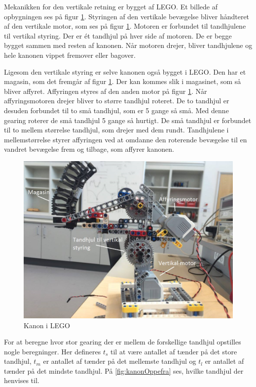 Mekanikken for den vertikale retning er bygget af LEGO. Et billede af opbygningen ses på figur \ref{fig:kanon}. Styringen af den vertikale bevægelse bliver håndteret af den vertikale motor, som ses på figur \ref{fig:kanon}. Motoren er forbundet til tandhjulene til vertikal styring. Der er ét tandhjul på hver side af motoren. De er begge bygget sammen med resten af kanonen. Når motoren drejer, bliver tandhjulene og hele kanonen vippet fremover eller bagover. 

Ligesom den vertikale styring er selve kanonen også bygget i LEGO. Den har et magasin, som det fremgår af figur \ref{fig:kanon}. Der kan kommes slik i magasinet, som så bliver affyret. Affyringen styres af den anden motor på figur \ref{fig:kanon}. Når affyringsmotoren drejer bliver to større tandhjul roteret. De to tandhjul er desuden forbundet til to små tandhjul, som er 5 gange så små. Med denne gearing roterer de små tandhjul 5 gange så hurtigt. De små tandhjul er forbundet til to mellem størrelse tandhjul, som drejer med dem rundt. Tandhjulene i mellemstørrelse styrer affyringen ved at omdanne den roterende bevægelse til en vandret bevægelse frem og tilbage, som affyrer kanonen.

\begin{figure}[H]
	\centering
	\includegraphics[width=1\textwidth]{Afsnit/DesignOgImplementering/images/kanon}
	\caption{Kanon i LEGO}
	\label{fig:kanon}
\end{figure}

For at beregne hvor stor gearing der er mellem de forskellige tandhjul opstilles nogle beregninger. Her defineres $t_{s}$ til at være antallet af tænder på det store tandhjul, $t_{m}$ er antallet af tænder på det mellemste tandhjul og $t_{l}$ er antallet af tænder på det mindste tandhjul. På \ref{fig:kanonOppefra} ses, hvilke tandhjul der henvises til. 

